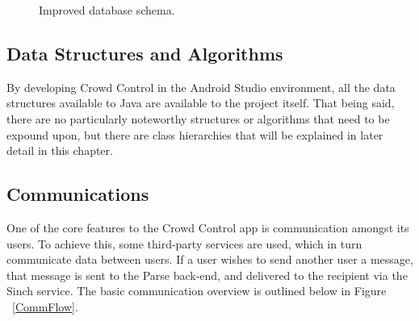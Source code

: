 	\begin{figure}[tbh!]
	\begin{center}
	\end{center}
	\caption{Improved database schema. \label{MidDBSchema}}
	\end{figure}

 \subsection{Data Structures and Algorithms}
 By developing Crowd Control in the Android Studio environment, all the data structures available to Java are available to the project itself. That being said, there are no particularly noteworthy structures or algorithms that need to be expound upon, but there are class hierarchies that will be explained in later detail in this chapter.

 
 \subsection{Communications}
 One of the core features to the Crowd Control app is communication amongst its users. To achieve this, some third-party services are used, which in turn communicate data between users. If a user wishes to send another user a message, that message is sent to the Parse back-end, and delivered to the recipient via the Sinch service. The basic communication overview is outlined below in Figure ~\ref{CommFlow}.
 
